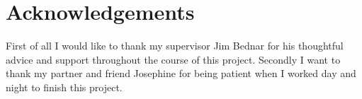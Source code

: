 


\begingroup

\let\clearpage\relax
\let\cleardoublepage\relax
\let\cleardoublepage\relax

\chapter*{Acknowledgements} %

First of all I would like to thank my supervisor Jim Bednar for his
thoughtful advice and support throughout the course of this project.
Secondly I want to thank my partner and friend Josephine for being
patient when I worked day and night to finish this project.

\endgroup
